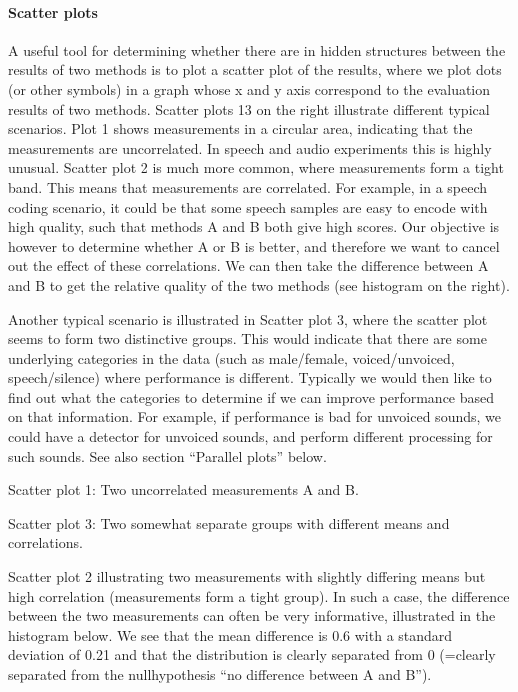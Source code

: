\documentclass[letterpaper,10pt,english]{jupyterBook}
\begin{document}
\paragraph{Scatter plots}
\label{\detokenize{Evaluation/Analysis_of_evaluation_results:scatter-plots}}
\sphinxAtStartPar
A useful tool for determining whether there are in hidden structures
between the results of two methods is to plot a scatter plot of the
results, where we plot dots (or other symbols) in a graph whose x\sphinxhyphen{} and
y\sphinxhyphen{} axis correspond to the evaluation results of two methods. Scatter
plots 1\sphinxhyphen{}3 on the right illustrate different typical scenarios. Plot 1
shows measurements in a circular area, indicating that the measurements
are uncorrelated. In speech and audio experiments this is highly
unusual. Scatter plot 2 is much more common, where measurements form a
tight band. This means that measurements are correlated. For example, in
a speech coding scenario, it could be that some speech samples are easy
to encode with high quality, such that methods A and B both give high
scores. Our objective is however to determine whether A or B is better,
and therefore we want to cancel out the effect of these correlations. We
can then take the difference between A and B to get the relative quality
of the two methods (see histogram on the right).

\sphinxAtStartPar
Another typical scenario is illustrated in Scatter plot 3, where the
scatter plot seems to form two distinctive groups. This would indicate
that there are some underlying categories in the data (such as
male/female, voiced/unvoiced, speech/silence) where performance is
different. Typically we would then like to find out what the categories
to determine if we can improve performance based on that information.
For example, if performance is bad for unvoiced sounds, we could have a
detector for unvoiced sounds, and perform different processing for such
sounds. See also section “Parallel plots” below.

\sphinxAtStartPar
Scatter plot 1: Two uncorrelated measurements A and B.

\sphinxAtStartPar
{}

\sphinxAtStartPar
Scatter plot 3: Two somewhat separate groups with different means and
correlations.

\sphinxAtStartPar
{}

\sphinxAtStartPar
Scatter plot 2 illustrating two measurements with slightly differing
means but high correlation (measurements form a tight group). In such a
case, the difference between the two measurements can often be very
informative, illustrated in the histogram below. We see that the mean
difference is 0.6 with a standard deviation of 0.21 and that the
distribution is clearly separated from 0 (=clearly separated from the
null\sphinxhyphen{}hypothesis “no difference between A and B”).
\end{document}
